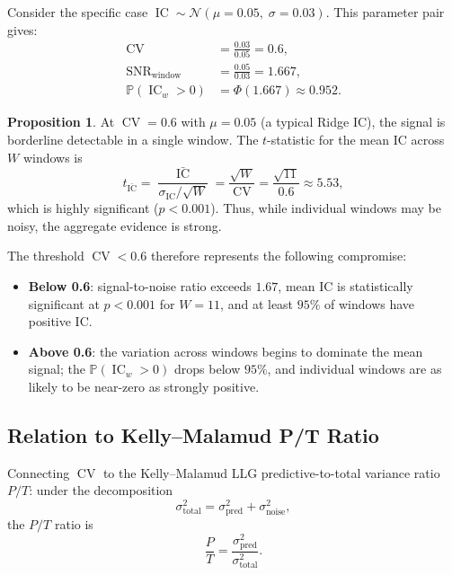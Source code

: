 \documentclass[11pt,a4paper]{article}
\theoremstyle{definition}
\newtheorem{proposition}{Proposition}[section]
\newcommand{\IC}{\operatorname{IC}}
\newcommand{\CV}{\operatorname{CV}}
\newcommand{\N}{\mathcal{N}}
\newcommand{\Prob}{\mathbb{P}}
\newcommand{\SNR}{\operatorname{SNR}}
\begin{document}
Consider the specific case $\IC \sim \N(\mu=0.05,\;\sigma=0.03)$.
This parameter pair gives:
\begin{align}
    \CV &= \frac{0.03}{0.05} = 0.6, \\
    \SNR_{\text{window}} &= \frac{0.05}{0.03} = 1.667, \\
    \Prob(\IC_w > 0) &= \Phi(1.667) \approx 0.952.
\end{align}

\begin{proposition}
    At $\CV = 0.6$ with $\mu = 0.05$ (a typical Ridge IC), the signal is
    borderline detectable in a single window.  The $t$-statistic for the
    mean IC across $W$ windows is
    \begin{equation}
        t_{\bar{\IC}} = \frac{\bar{\IC}}{\sigma_{\IC}/\sqrt{W}}
                      = \frac{\sqrt{W}}{\CV}
                      = \frac{\sqrt{11}}{0.6} \approx 5.53,
    \end{equation}
    which is highly significant ($p < 0.001$).  Thus, while individual
    windows may be noisy, the aggregate evidence is strong.
\end{proposition}

The threshold $\CV < 0.6$ therefore represents the following compromise:
\begin{itemize}
    \item \textbf{Below 0.6}: signal-to-noise ratio exceeds $1.67$, mean IC
          is statistically significant at $p < 0.001$ for $W=11$, and at least
          $95\%$ of windows have positive IC.
    \item \textbf{Above 0.6}: the variation across windows begins to
          dominate the mean signal; the $\Prob(\IC_w > 0)$ drops below
          $95\%$, and individual windows are as likely to be near-zero
          as strongly positive.
\end{itemize}

\subsection{Relation to Kelly--Malamud P/T Ratio}

Connecting $\CV$ to the Kelly--Malamud LLG predictive-to-total variance
ratio $P/T$: under the decomposition
\begin{equation}
    \sigma_{\text{total}}^2 = \sigma_{\text{pred}}^2 + \sigma_{\text{noise}}^2,
\end{equation}
the $P/T$ ratio is
\begin{equation}
    \frac{P}{T} = \frac{\sigma_{\text{pred}}^2}{\sigma_{\text{total}}^2}.
\end{equation}
\end{document}
